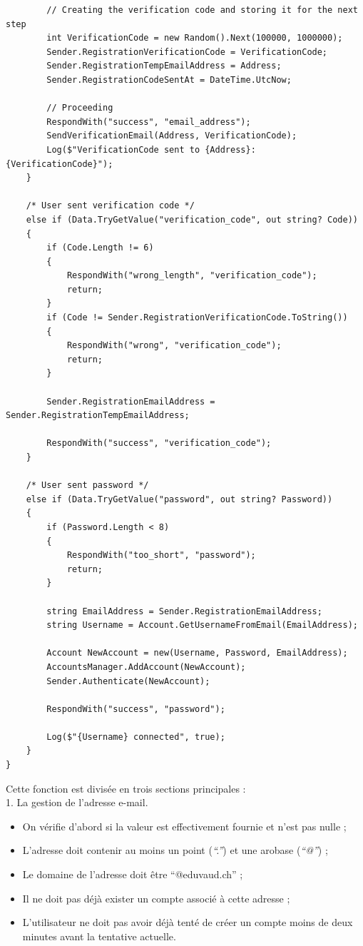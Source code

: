 \documentclass[12pt]{report}
\begin{document}
\begin{verbatim}
        // Creating the verification code and storing it for the next step
        int VerificationCode = new Random().Next(100000, 1000000);
        Sender.RegistrationVerificationCode = VerificationCode;
        Sender.RegistrationTempEmailAddress = Address;
        Sender.RegistrationCodeSentAt = DateTime.UtcNow;

        // Proceeding
        RespondWith("success", "email_address");
        SendVerificationEmail(Address, VerificationCode);
        Log($"VerificationCode sent to {Address}: {VerificationCode}");
    }

    /* User sent verification code */
    else if (Data.TryGetValue("verification_code", out string? Code))
    {
        if (Code.Length != 6)
        {
            RespondWith("wrong_length", "verification_code");
            return;
        }
        if (Code != Sender.RegistrationVerificationCode.ToString())
        {
            RespondWith("wrong", "verification_code");
            return;
        }

        Sender.RegistrationEmailAddress = Sender.RegistrationTempEmailAddress;

        RespondWith("success", "verification_code");
    }

    /* User sent password */
    else if (Data.TryGetValue("password", out string? Password))
    {
        if (Password.Length < 8)
        {
            RespondWith("too_short", "password");
            return;
        }

        string EmailAddress = Sender.RegistrationEmailAddress;
        string Username = Account.GetUsernameFromEmail(EmailAddress);

        Account NewAccount = new(Username, Password, EmailAddress);
        AccountsManager.AddAccount(NewAccount);
        Sender.Authenticate(NewAccount);

        RespondWith("success", "password");

        Log($"{Username} connected", true);
    }
}
\end{verbatim}

Cette fonction est divisée en trois sections principales :
\\

1. La gestion de l’adresse e-mail.

\begin{itemize}
    \item On vérifie d'abord si la valeur est effectivement fournie et n'est pas nulle ;
    \item L’adresse doit contenir au moins un point (\textit{“.”}) et une arobase (\textit{“@”}) ;
    \item Le domaine de l’adresse doit être “@eduvaud.ch” ;
    \item Il ne doit pas déjà exister un compte associé à cette adresse ;
    \item L’utilisateur ne doit pas avoir déjà tenté de créer un compte moins de deux minutes avant la tentative actuelle.
\end{itemize}
\end{document}
